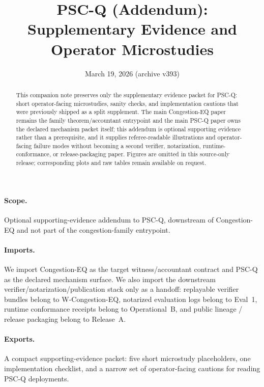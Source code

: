 \documentclass[11pt]{article}
\title{PSC-Q (Addendum):\\Supplementary Evidence and Operator Microstudies}
\author{}
\date{March 19, 2026 (archive v393)}
\theoremstyle{definition}
\theoremstyle{remark}
\begin{document}
\maketitle

\begin{abstract}
This companion note preserves only the supplementary evidence packet for PSC-Q: short operator-facing microstudies, sanity checks, and implementation cautions that were previously shipped as a split supplement.
The main Congestion-EQ paper remains the family theorem/accountant entrypoint and the main PSC-Q paper owns the declared mechanism packet itself; this addendum is optional supporting evidence rather than a prerequisite, and it supplies referee-readable illustrations and operator-facing failure modes without becoming a second verifier, notarization, runtime-conformance, or release-packaging paper.
Figures are omitted in this source-only release; corresponding plots and raw tables remain available on request.\cite{series:artifactpolicy}
\end{abstract}

\paragraph{Scope.}
Optional supporting-evidence addendum to PSC-Q, downstream of Congestion-EQ and not part of the congestion-family entrypoint.\cite{series:congeq,series:pscq}

\paragraph{Imports.}
We import Congestion-EQ as the target witness/accountant contract and PSC-Q as the declared mechanism surface.\cite{series:congeq,series:pscq}
We also import the downstream verifier/notarization/publication stack only as a handoff: replayable verifier bundles belong to W-Congestion-EQ, notarized evaluation logs belong to Eval~1, runtime conformance receipts belong to Operational~B, and public lineage / release packaging belong to Release~A.\cite{series:wcongeq,series:evalnotary,series:opb,series:releaseproperty}

\paragraph{Exports.}
A compact supporting-evidence packet: five short microstudy placeholders, one implementation checklist, and a narrow set of operator-facing cautions for reading PSC-Q deployments.
\end{document}
